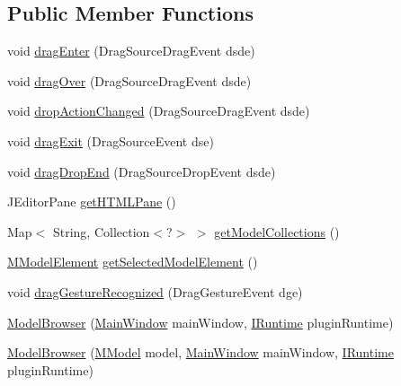 \subsection*{Public Member Functions}
\begin{DoxyCompactItemize}
\item 
void \hyperlink{classorg_1_1tzi_1_1use_1_1gui_1_1main_1_1_model_browser_adb4edb3c9ab69f54ce302e82c24bc721}{drag\-Enter} (Drag\-Source\-Drag\-Event dsde)
\item 
void \hyperlink{classorg_1_1tzi_1_1use_1_1gui_1_1main_1_1_model_browser_a131b35ab74d077321c92799dfd1dd6ab}{drag\-Over} (Drag\-Source\-Drag\-Event dsde)
\item 
void \hyperlink{classorg_1_1tzi_1_1use_1_1gui_1_1main_1_1_model_browser_ab82ae759587db3ffdb4bf533f42c5288}{drop\-Action\-Changed} (Drag\-Source\-Drag\-Event dsde)
\item 
void \hyperlink{classorg_1_1tzi_1_1use_1_1gui_1_1main_1_1_model_browser_a2abd851e3dd6b4e45935f2e2f74c00c2}{drag\-Exit} (Drag\-Source\-Event dse)
\item 
void \hyperlink{classorg_1_1tzi_1_1use_1_1gui_1_1main_1_1_model_browser_ac0904dabe21fd597afab919e3bd9caac}{drag\-Drop\-End} (Drag\-Source\-Drop\-Event dsde)
\item 
J\-Editor\-Pane \hyperlink{classorg_1_1tzi_1_1use_1_1gui_1_1main_1_1_model_browser_a3c76829a40a4a63dbdaa4ffb38c9bab7}{get\-H\-T\-M\-L\-Pane} ()
\item 
Map$<$ String, Collection$<$?$>$ $>$ \hyperlink{classorg_1_1tzi_1_1use_1_1gui_1_1main_1_1_model_browser_aa83be7501861c59e4211ad9d4dac06d6}{get\-Model\-Collections} ()
\item 
\hyperlink{interfaceorg_1_1tzi_1_1use_1_1uml_1_1mm_1_1_m_model_element}{M\-Model\-Element} \hyperlink{classorg_1_1tzi_1_1use_1_1gui_1_1main_1_1_model_browser_a73841a5e2d4600e918fb8974749b9e9f}{get\-Selected\-Model\-Element} ()
\item 
void \hyperlink{classorg_1_1tzi_1_1use_1_1gui_1_1main_1_1_model_browser_aaf21f16b5193b7afb88d41f1e75f17dc}{drag\-Gesture\-Recognized} (Drag\-Gesture\-Event dge)
\item 
\hyperlink{classorg_1_1tzi_1_1use_1_1gui_1_1main_1_1_model_browser_adf07da8abd2d2323ff07a7dfed8cfd41}{Model\-Browser} (\hyperlink{classorg_1_1tzi_1_1use_1_1gui_1_1main_1_1_main_window}{Main\-Window} main\-Window, \hyperlink{interfaceorg_1_1tzi_1_1use_1_1main_1_1runtime_1_1_i_runtime}{I\-Runtime} plugin\-Runtime)
\item 
\hyperlink{classorg_1_1tzi_1_1use_1_1gui_1_1main_1_1_model_browser_a0b7c567f0bf644721c5c9b0160170fad}{Model\-Browser} (\hyperlink{classorg_1_1tzi_1_1use_1_1uml_1_1mm_1_1_m_model}{M\-Model} model, \hyperlink{classorg_1_1tzi_1_1use_1_1gui_1_1main_1_1_main_window}{Main\-Window} main\-Window, \hyperlink{interfaceorg_1_1tzi_1_1use_1_1main_1_1runtime_1_1_i_runtime}{I\-Runtime} plugin\-Runtime)

\end{DoxyCompactItemize}
